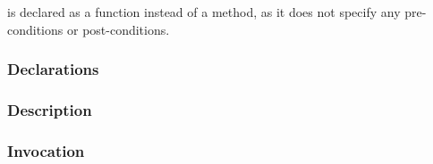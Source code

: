 \def\Subsubsection#1{\subsubsection{#1}}

 is declared as a function instead of a method,
as it does not specify any pre-conditions or post-conditions.

\Subsubsection{Declarations}

\Subsubsection{Description}

\Subsubsection{Invocation}
